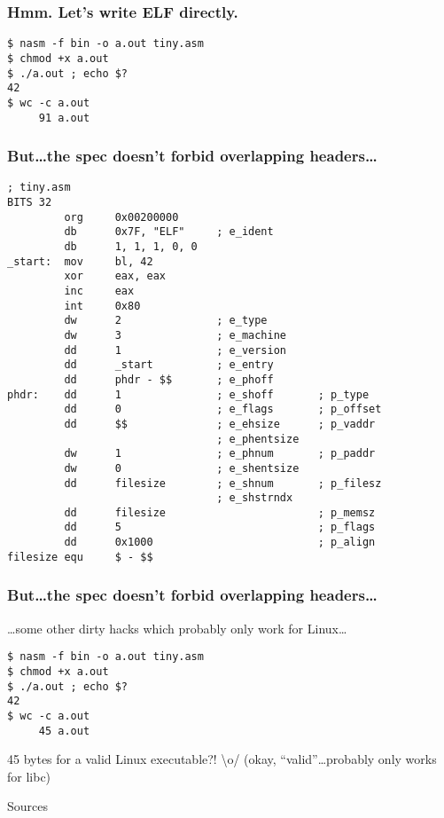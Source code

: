 \documentclass{beamer}
\begin{document}
\begin{frame}[fragile]
\frametitle{Hmm. Let's write ELF directly.}
\begin{lstlisting}
$ nasm -f bin -o a.out tiny.asm
$ chmod +x a.out
$ ./a.out ; echo $?
42
$ wc -c a.out
     91 a.out
\end{lstlisting}
\end{frame}

\begin{frame}[fragile]
\frametitle{But\ldots the spec doesn't forbid overlapping headers\ldots}
\begin{lstlisting}[basicstyle=\tiny\ttfamily]
; tiny.asm
BITS 32
         org     0x00200000
         db      0x7F, "ELF"     ; e_ident
         db      1, 1, 1, 0, 0
_start:  mov     bl, 42
         xor     eax, eax
         inc     eax
         int     0x80
         dw      2               ; e_type
         dw      3               ; e_machine
         dd      1               ; e_version
         dd      _start          ; e_entry
         dd      phdr - $$       ; e_phoff
phdr:    dd      1               ; e_shoff       ; p_type
         dd      0               ; e_flags       ; p_offset
         dd      $$              ; e_ehsize      ; p_vaddr
                                 ; e_phentsize
         dw      1               ; e_phnum       ; p_paddr
         dw      0               ; e_shentsize
         dd      filesize        ; e_shnum       ; p_filesz
                                 ; e_shstrndx
         dd      filesize                        ; p_memsz
         dd      5                               ; p_flags
         dd      0x1000                          ; p_align
filesize equ     $ - $$
\end{lstlisting}
\end{frame}

\begin{frame}[fragile]
\frametitle{But\ldots the spec doesn't forbid overlapping headers\ldots}
\ldots some other dirty hacks which probably only work for Linux\ldots
\begin{lstlisting}
$ nasm -f bin -o a.out tiny.asm
$ chmod +x a.out
$ ./a.out ; echo $?
42
$ wc -c a.out
     45 a.out
\end{lstlisting}

45 bytes for a valid Linux executable?! \textbackslash{}o/
(okay, ``valid''\ldots probably only works for libc)
\end{frame}

\begin{frame}{Sources}
\begin{thebibliography}{9}
\end{thebibliography}
\end{frame}
\end{document}
